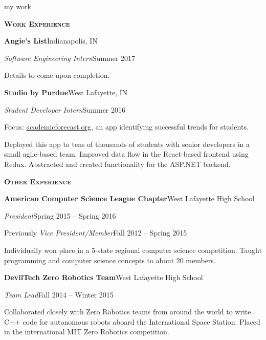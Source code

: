 \documentclass[11pt]{article}
\newcommand{\sectionfont}{\Large\scshape\bfseries\color{cg505green}}
\newcommand{\impact}[1]{\textcolor{cg505green}{\nohyphens{#1}}}
\begin{document}
\begin{minipage}[t]{0.67\textwidth}
  {\Huge\color{black} my work \phantom{me}}

  \vspace{5pt}

  {\sectionfont Work Experience}

  \textbf{Angie's List}\hfill Indianapolis, IN
  \begin{adjustwidth}{10pt}{}
    \emph{Software Engineering Intern}\hfill Summer 2017

    Details to come upon completion.
  \end{adjustwidth}

  \textbf{Studio by Purdue}\hfill West Lafayette, IN
  \begin{adjustwidth}{10pt}{}
    \emph{Student Developer Intern}\hfill Summer 2016

    Focus: \href{https://academicforecast.org/about/}{academicforecast.org}, an app identifying successful trends for students.

    \impact{Deployed this app to tens of thousands} of students with senior developers in a small agile-based team.
    Improved data flow in the React-based frontend using Redux.
    Abstracted and created functionality for the ASP.NET backend.
  \end{adjustwidth}

  \vspace{5pt}

  {\sectionfont Other Experience}

  \textbf{American Computer Science League Chapter}\hfill West Lafayette High School
  \begin{adjustwidth}{10pt}{}
    \emph{President}\hfill Spring 2015 -- Spring 2016

    Previously \emph{Vice President/Member}\hfill Fall 2012 -- Spring 2015

    Individually \impact{won  place} in a 5-state regional computer science competition.
    Taught programming and computer science concepts to about 20 members.
  \end{adjustwidth}

  \textbf{DevilTech Zero Robotics Team}\hfill West Lafayette High School
  \begin{adjustwidth}{10pt}{}
    \emph{Team Lead}\hfill Fall 2014 -- Winter 2015

    Collaborated closely with Zero Robotics teams from \impact{around the world} to write C++ code for autonomous robots aboard the International Space Station.
    \impact{Placed } in the international MIT Zero Robotics competition.
  \end{adjustwidth}


\end{minipage}
\end{document}
